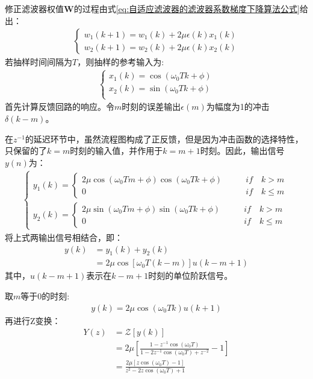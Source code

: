 \documentclass{ctexart}
\begin{document}
				修正滤波器权值$\bm{W}$的过程由式\ref{eq:自适应滤波器的滤波器系数梯度下降算法公式}给出：
				\begin{gather}
					\begin{cases}
						w_1(k+1)=w_1(k)+2\mu\epsilon(k)x_1(k)\\
						w_2(k+1)=w_2(k)+2\mu\epsilon(k)x_2(k)
					\end{cases}
				\end{gather}
				若抽样时间间隔为$T$，则抽样的参考输入为:
				\begin{gather}
					\begin{cases}
						x_1(k)=\cos(\omega_0Tk+\phi)\\
						x_2(k)=\sin(\omega_0Tk+\phi)\\
					\end{cases}
				\end{gather}
				首先计算反馈回路的响应。令$m$时刻的误差输出$\epsilon(m)$为幅度为1的冲击$\delta(k-m)$。\par
				在$z^{-1}$的延迟环节中，虽然流程图构成了正反馈，但是因为冲击函数的选择特性，只保留的了$k=m$时刻的输入值，并作用于$k=m+1$时刻。因此，输出信号$y(n)$为：
				\begin{gather}
					\begin{cases}
						y_1(k)=
						\begin{cases}
							 2\mu\cos(\omega_0Tm+\phi)\cos(\omega_0Tk+\phi)\qquad&if\quad k> m\\
							 0 &if \quad k\leq m
						\end{cases}\\
						y_2(k)=
						\begin{cases}
							2\mu\sin(\omega_0Tm+\phi)\sin(\omega_0Tk+\phi)\qquad&if\quad k> m\\
							0 &if \quad k\leq m
						\end{cases}
					\end{cases}
				\end{gather}
				将上式两输出信号相结合，即：
				\begin{align}
					y(k)&=y_1(k)+y_2(k)\\
					&=2\mu \cos[\omega_0T(k-m)]u(k-m+1)
				\end{align}
				其中，$u(k-m+1)$表示在$k-m+1$时刻的单位阶跃信号。\par
				取$m$等于0的时刻:
				\begin{gather}
					y(k)=2\mu \cos(\omega_0Tk)u(k+1)
				\end{gather}
				再进行Z变换：
				\begin{align}
					Y(z)&=\mathcal{Z}[y(k)]\\
					&=2\mu[\frac{1-z^{-1}\cos(\omega_0T)}{1-2z^{-1}\cos(\omega_0T)+z^{-2}}-1]\\
					&=\frac{2\mu[z\cos(\omega_0T)-1]}{z^2-2z\cos(\omega_0T)+1}
					\label{eq:反馈回路的传递函数}
				\end{align}
\end{document}
